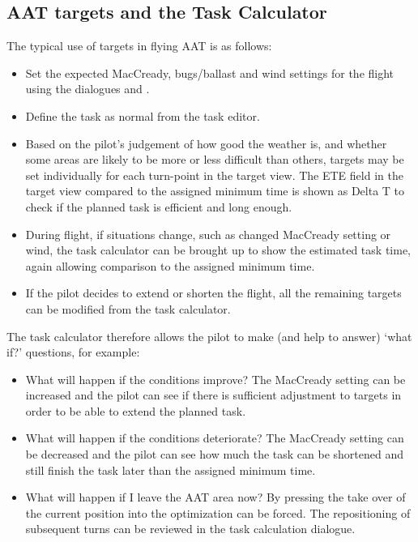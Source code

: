 \subsection*{AAT targets and the Task Calculator}

The typical use of targets in flying AAT is as follows:
\begin{itemize}
\item Set the expected MacCready, bugs/ballast and wind settings
  for the flight using the dialogues  and .
\item Define the task as normal from the task editor.
\item Based on the pilot's judgement of how good the weather is,
  and whether some areas are likely to be more or less difficult than
  others, targets may be set individually for each turn-point in the
  target view.  The ETE field in the target view compared to
  the assigned minimum time is shown as Delta T to check if the planned 
  task is efficient and long enough.
\item During flight, if situations change, such as changed MacCready setting
  or wind, the task calculator can be brought up to show the estimated
  task time, again allowing comparison to the assigned minimum time.
\item If the pilot decides to extend or shorten the flight, all the remaining
  targets can be modified from the task calculator. 
\end{itemize}

The task calculator therefore allows the pilot to make (and help to
answer) `what if?' questions, for example:
\begin{itemize}
\item What will happen if the conditions improve?  The MacCready setting can be 
increased and the pilot can see if there is sufficient adjustment to targets in 
order to be able to extend the planned task.
\item What will happen if the conditions deteriorate?  The MacCready setting can 
be decreased and the pilot can see how much the task can be shortened and still 
finish the task later than the assigned minimum time.
\item What will happen if I leave the AAT area now?  By pressing  the take over of the current position into the optimization can
be forced. The repositioning of subsequent turns can be reviewed in the task calculation
dialogue.
\end{itemize}

